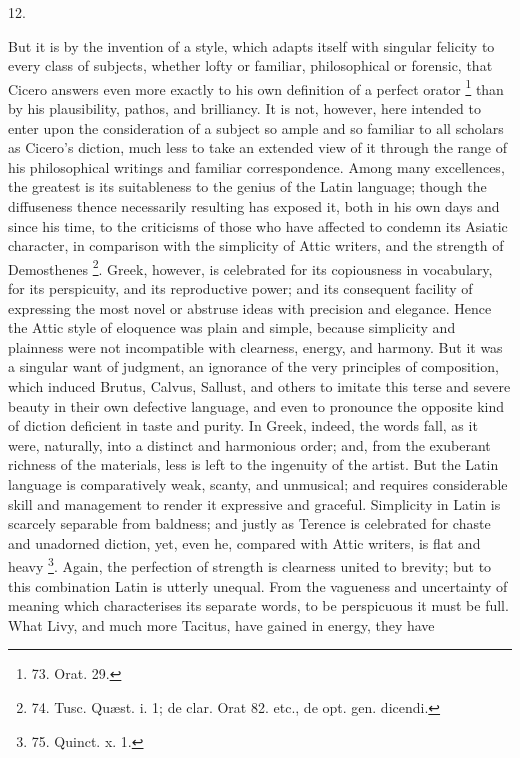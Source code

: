 12.

But it is by the invention of
a style, which adapts itself with singular felicity to every class of
subjects, whether lofty or familiar, philosophical or forensic, that
Cicero answers even more exactly to his own definition of a perfect
orator \footnote{73.
Orat. 29.} than by his plausibility, pathos, and brilliancy. It
is not, however, here intended to enter upon the consideration of a
subject so ample and so familiar to all scholars as Cicero's
diction, much less to take an extended view of it through the range of
his philosophical writings and familiar correspondence. Among many
excellences, the greatest is its suitableness to the genius of the
Latin language; though the diffuseness thence necessarily resulting
has exposed it, both in his own days and since his time, to the
criticisms of those who have affected to condemn its Asiatic
character, in comparison with the simplicity of Attic writers, and the
strength of Demosthenes \footnote{74. Tusc. Quæst. i. 1; de
clar. Orat 82. etc., de opt. gen. dicendi.}. Greek, however, is celebrated for
its copiousness in vocabulary, for its perspicuity, and its
reproductive power; and its consequent facility of expressing the most
novel or abstruse ideas with precision and elegance. Hence the Attic
style of eloquence was plain and simple, because simplicity and
plainness were not incompatible with clearness, energy, and harmony.
But it was a singular want of judgment, an ignorance of the very
principles of composition, which induced Brutus, Calvus, Sallust, and
others to imitate this terse and severe beauty in their own defective
language, and even to pronounce the opposite kind of diction deficient
in taste and purity. In Greek, indeed, the words fall, as it were,
naturally, into a distinct and harmonious order; and, from the
exuberant richness of the materials, less is left to the ingenuity of
the artist. But the Latin language is comparatively weak, scanty, and
unmusical; and requires considerable skill and management to render it
expressive and graceful. Simplicity in Latin is scarcely separable
from baldness; and justly as Terence is celebrated for chaste and
unadorned diction, yet, even he, compared with Attic writers, is flat
and heavy \footnote{75. Quinct. x. 1.}. Again, the perfection of strength is
clearness united to brevity; but to this combination Latin is utterly
unequal. From the vagueness and uncertainty of meaning which
characterises its separate words, to be perspicuous it must be full.
What Livy, and much more Tacitus, have gained in energy, they have
